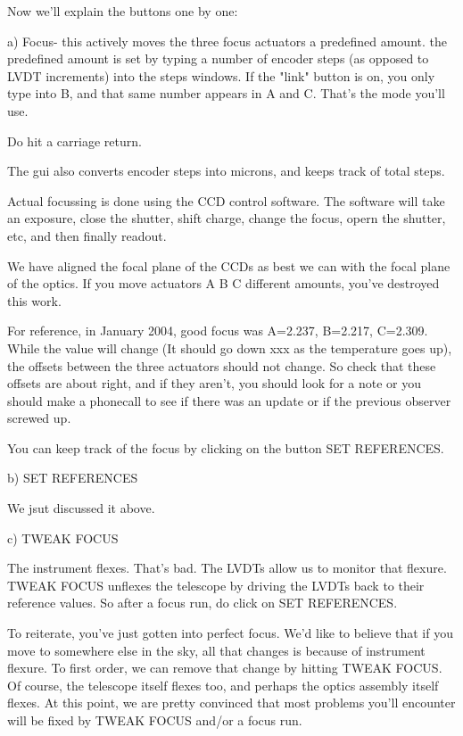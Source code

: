 \documentclass[letterpaper,12pt]{article}
\begin{document}
         Now we'll explain the buttons one by one:
        
       a)  Focus- this actively moves the three focus actuators
          a predefined amount. the predefined amount is set by typing
          a number of encoder steps (as opposed to LVDT increments)
          into the steps windows. If the "link" button is on, you only
          type into B, and that same number appears in A and C.
          That's the mode you'll use.

          Do hit a carriage return.

          The gui also converts encoder steps into microns, and keeps
          track of total steps.

          Actual focussing is done using the CCD control software.
          The software will take an exposure, close the shutter,
          shift charge, change the focus, opern the shutter, etc,
          and then finally readout. 

          We have aligned the focal plane of the CCDs as best we can with
          the focal plane of the optics. If you move actuators A B C
          different amounts, you've destroyed this work.

          For reference, in January 2004, good focus was A=2.237, B=2.217,
          C=2.309. While the value will change (It should go down xxx
          as the temperature goes up), the offsets between the three actuators
          should not change. So check that these offsets are about right,
          and if they aren't, you should look for a note or you should make
          a phonecall to see if there was an update or if the previous
          observer screwed up.

          You can keep track of the focus by clicking on the button
          SET REFERENCES.

       b) SET REFERENCES
    
          We jsut discussed it above.

       c) TWEAK FOCUS

          The instrument flexes. That's bad. The LVDTs allow us to
          monitor that flexure. TWEAK FOCUS unflexes the telescope by
          driving the LVDTs back to their reference values. So after
          a focus run, do click on SET REFERENCES.

          To reiterate, you've just gotten into perfect focus. We'd
          like to believe that if you move to somewhere else in the sky,
          all that changes is because of instrument flexure. To first
          order, we can remove that change by hitting TWEAK FOCUS.
          Of course, the telescope itself flexes too, and perhaps
          the optics assembly itself flexes. At this point, we are
          pretty convinced that most problems you'll encounter
          will be fixed by TWEAK FOCUS and/or a focus run.
\end{document}
